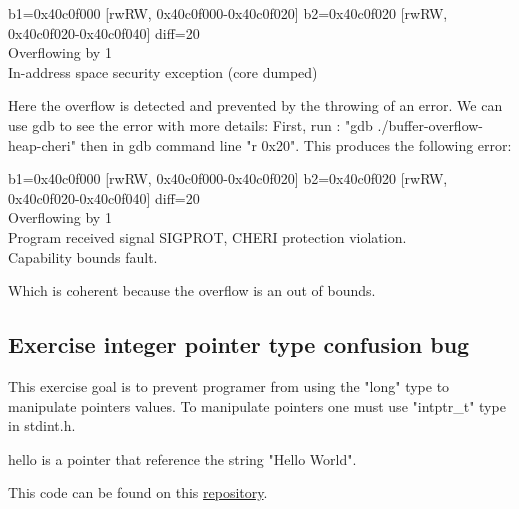 \documentclass[a4paper, 11pt]{article}
\begin{document}
		\begin{tcolorbox}[colback=gray!5!white, colframe=blue!75!black, title=Heap Overflow with 0x20 as parameter with CHERI protection]
			b1=0x40c0f000 [rwRW, 0x40c0f000-0x40c0f020] b2=0x40c0f020 [rwRW, 0x40c0f020-0x40c0f040] diff=20\\
			Overflowing by 1\\
			In-address space security exception (core dumped)
		\end{tcolorbox}
		Here the overflow is detected and prevented by the throwing of an error.
		We can use gdb to see the error with more details:
		First, run : "gdb ./buffer-overflow-heap-cheri" then in gdb command line "r 0x20".
		This produces the following error:
		\begin{tcolorbox}[colback=gray!5!white, colframe=black!75!black, title=GDB: Heap Overflow with 0x20 as parameter with CHERI protection]
			b1=0x40c0f000 [rwRW, 0x40c0f000-0x40c0f020] b2=0x40c0f020 [rwRW, 0x40c0f020-0x40c0f040] diff=20\\
			Overflowing by 1\\
			
			Program received signal SIGPROT, CHERI protection violation.\\
			Capability bounds fault.
		\end{tcolorbox}
		Which is coherent because the overflow is an out of bounds.
	
	\subsection{Exercise integer pointer type confusion bug}
		This exercise goal is to prevent programer from using the "long" type to manipulate pointers values. 
		To manipulate pointers one must use "intptr\_t" type in stdint.h. 
		
		hello is a pointer that reference the string "Hello World". 
		

		This code can be found on this \href{https://ctsrd-cheri.github.io/cheri-exercises/exercises/type-confusion/}{repository}.
    
\end{document}
